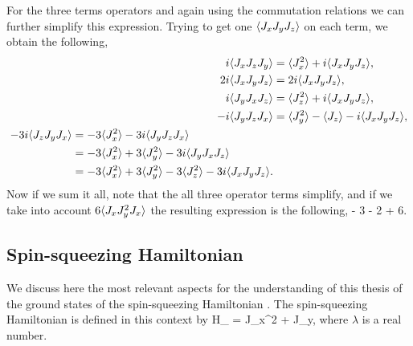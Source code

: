 For the three terms operators and again using the commutation relations we can further simplify this expression. Trying to get one $\langle{J_xJ_yJ_z}\rangle$ on each term, we obtain the following,
\begin{subequations}
\begin{align}
  i\langle{J_xJ_zJ_y}\rangle & = \langle{J_x^2}\rangle+i\langle{J_xJ_yJ_z}\rangle,
  \label{eq:ap-last-terms-1} \\
  2i\langle{J_xJ_yJ_z}\rangle & = 2i\langle{J_xJ_yJ_z}\rangle,
  \label{eq:ap-last-term-2} \\
  i\langle{J_yJ_xJ_z}\rangle & = \langle{J_z^2}\rangle+i\langle{J_xJ_yJ_z}\rangle,
  \label{eq:ap-simplification-3} \\
  -i\langle{J_yJ_zJ_x}\rangle & = \langle{J_y^2}\rangle - \langle{J_z}\rangle - i\langle{J_xJ_yJ_z}\rangle, \\
\begin{split}
  -3i\langle{J_zJ_yJ_x}\rangle & = -3\langle{J_x^2}\rangle - 3i \langle{J_yJ_zJ_x}\rangle \\
  & = -3\langle{J_x^2}\rangle + 3 \langle{J_y^2}\rangle - 3i\langle{J_yJ_xJ_z}\rangle \\
  & = -3\langle{J_x^2}\rangle + 3 \langle{J_y^2}\rangle - 3\langle{J_z^2}\rangle
   - 3i \langle{J_xJ_yJ_z}\rangle.
  \label{eq:ap-simplification-4}
\end{split}
\end{align}
\end{subequations}
Now if we sum it all, note that the all three operator terms simplify, and if we take into account $6\langle{J_xJ_y^2J_x}\rangle$ the resulting expression is the following,
 - 3  - 2 + 6.
\ee


\subsection{Spin-squeezing Hamiltonian}
\label{app:spin-squeezing-hamiltonian}

We discuss here the most relevant aspects for the understanding of this thesis of the ground states of the spin-squeezing Hamiltonian \cite{Sorensen2001a}.
The spin-squeezing Hamiltonian is defined in this context by
\be
  H_{\lambda} = \pm J_x^2 + \lambda J_y,
  \label{eq:app-spsq-h}
\ee
where $\lambda$ is a real number.

